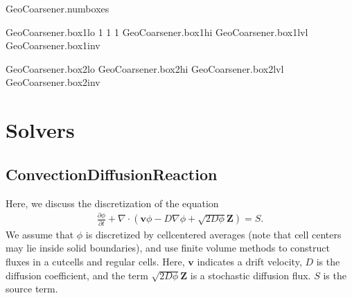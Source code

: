 \documentclass[letterpaper,10pt,english]{sphinxmanual}
\begin{document}
\begin{sphinxVerbatim}[commandchars=\\\{\},formatcom=\scriptsize]
GeoCoarsener.num\PYGZus{}boxes                

GeoCoarsener.box1\PYGZus{}lo      \PYGZhy{}1 \PYGZhy{}1 \PYGZhy{}1     
GeoCoarsener.box1\PYGZus{}hi                
GeoCoarsener.box1\PYGZus{}lvl                 
GeoCoarsener.box1\PYGZus{}inv             

GeoCoarsener.box2\PYGZus{}lo                
GeoCoarsener.box2\PYGZus{}hi                
GeoCoarsener.box2\PYGZus{}lvl                 
GeoCoarsener.box2\PYGZus{}inv             
\end{sphinxVerbatim}


\chapter{Solvers}
\label{\detokenize{index:solvers}}

\section{Convection\sphinxhyphen{}Diffusion\sphinxhyphen{}Reaction}
\label{\detokenize{Solvers/CDR:convection-diffusion-reaction}}\label{\detokenize{Solvers/CDR:chap-cdr}}\label{\detokenize{Solvers/CDR::doc}}
Here, we discuss the discretization of the equation
\begin{equation*}
\begin{split}\frac{\partial \phi}{\partial t} + \nabla\cdot\left(\mathbf{v} \phi - D\nabla \phi + \sqrt{2D\phi}\mathbf{Z}\right) = S.\end{split}
\end{equation*}
We assume that \(\phi\) is discretized by cell\sphinxhyphen{}centered averages (note that cell centers may lie inside solid boundaries), and use finite volume methods to construct fluxes in a cut\sphinxhyphen{}cells and regular cells.
Here, \(\mathbf{v}\) indicates a drift velocity, \(D\) is the diffusion coefficient, and the term \(\sqrt{2D\phi}\mathbf{Z}\) is a stochastic diffusion flux. \(S\) is the source term.
\end{document}
